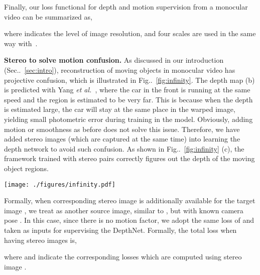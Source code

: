 \documentclass[runningheads]{llncs}
\makeatletter
\newcommand{\figref}[1]{Fig\onedot~\ref{#1}}
\newcommand{\secref}[1]{Sec\onedot~\ref{#1}}
\DeclareRobustCommand\onedot{\futurelet\@let@token\@onedot}
\def\onedot{\ifx\@let@token.\else.\null\fi\xspace}
\def\etal{\emph{et al.}}
\makeatother
\begin{document}
Finally, our loss functional for depth and motion supervision from a monocular video can be summarized as,

where  indicates the level of image resolution, and four scales are used in the same way with~\cite{zhou2017unsupervised}.

\noindent\textbf{Stereo to solve motion confusion.}
As discussed in our introduction (\secref{sec:intro}), reconstruction of moving objects in monocular video has projective confusion, which is illustrated in \figref{fig:infinity}. The depth map (b) is predicted with Yang \etal~\cite{yang2018cvpr}, where the car in the front is running at the same speed and the region is estimated to be very far. This is because when the depth is estimated large, the car will stay at the same place in the warped image, yielding small photometric error during training in the model. Obviously, adding motion or smoothness as before does not solve this issue. Therefore, we have added stereo images (which are captured at the same time) into learning the depth network to avoid such confusion. As shown in \figref{fig:infinity} (c), the framework trained with stereo pairs correctly figures out the depth of the moving object regions. 

\begin{figure*}
\vspace{-0.5\baselineskip}
\centering
\texttt{[image: ./figures/infinity.pdf]}
\caption{Moving object in the scene (a) causes large depth value confusion for framework trained with monocular videos, as shown in (b). This issue can be resolved by incorporating stereo training samples into the framework (c). }
\label{fig:infinity}
\vspace{-0.5\baselineskip}
\end{figure*}

Formally, when corresponding stereo image  is additionally available for the target image , we treat  as another source image, similar to , but with known camera pose . In this case, since there is no motion factor, we adopt the same loss of  and  taken  as inputs for supervising the DepthNet. Formally, the total loss when having stereo images is, 

where  and  indicate the corresponding losses which are computed using stereo image .
\end{document}
